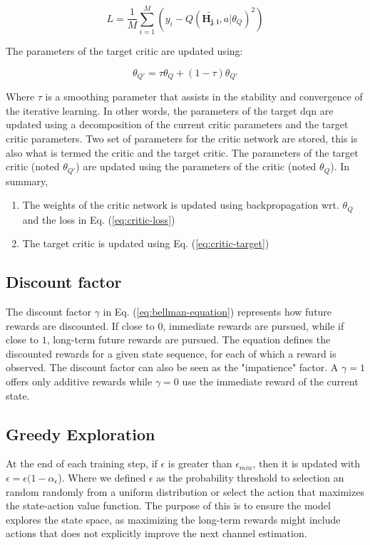 \begin{equation}\label{eq:critic-loss}
     L = \frac{1}{M} \sum_{i=1}^M(y_i - Q(\mathbf{\widetilde{H_{j,i}}}, a| \theta_Q)^2)
\end{equation}


\noindent The parameters of the target critic are updated using:

\begin{equation}\label{eq:critic-target}
    \theta_{Q'} = \tau \theta_Q + (1-\tau ) \theta_{Q'}
\end{equation}

\noindent Where $\tau$ is a smoothing parameter that assists in the stability and convergence of the iterative learning. In other words, the parameters of the target \gls{dqn} are updated using a decomposition of the current critic parameters and the target critic parameters. Two set of parameters for the critic network are stored, this is also what is termed the critic and the target critic. The parameters of the target critic (noted $\theta_{Q'}$) are updated using the parameters of the critic (noted $\theta_Q$). In summary, 

\begin{enumerate}
    \item The weights of the critic network is updated using backpropagation wrt. $\theta_Q$ and the loss in Eq. (\ref{eq:critic-loss})
    \item The target critic is updated using Eq. (\ref{eq:critic-target})
\end{enumerate}

\subsection{Discount factor}
The discount factor $\gamma$ in Eq. (\ref{eq:bellman-equation}) represents how future rewards are discounted. If close to $0$, immediate rewards are pursued, while if close to $1$, long-term future rewards are pursued. The equation defines the discounted rewards for a given state sequence, for each of which a reward is observed. The discount factor can also be seen as the "impatience" factor. A $\gamma = 1$ offers only additive rewards while $\gamma = 0$ use the immediate reward of the current state. 

\subsection{Greedy Exploration}
At the end of each training step, if $\epsilon$ is greater than $\epsilon_{min}$, then it is updated with $\epsilon = \epsilon (1-\alpha_{\epsilon}$). Where we defined $\epsilon$ as the probability threshold to selection an random randomly from a uniform distribution or select the action that maximizes the state-action value function. The purpose of this is to ensure the model explores the state space, as maximizing the long-term rewards might include actions that does not explicitly improve the next channel estimation.




